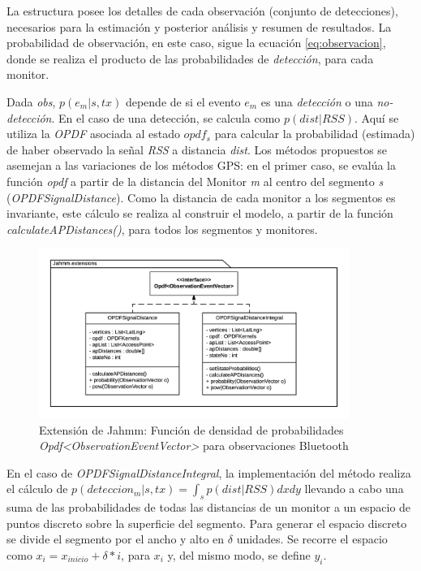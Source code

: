 La estructura posee los detalles de cada observación (conjunto de detecciones), necesarios para la estimación y posterior análisis y resumen de resultados. La probabilidad de observación, en este caso, sigue la ecuación \ref{eq:observacion}, donde se realiza el producto de las probabilidades de \textit{detección}, para cada monitor.

Dada \textit{obs}, $p(e_m|s,tx)$ depende de si el evento $e_m$ es una \textit{detección} o una \textit{no-detección}. En el caso de una detección, se calcula como $p(dist|RSS)$. Aquí se utiliza la \textit{OPDF} asociada al estado $opdf_s$ para calcular la probabilidad (estimada) de haber observado la señal \textit{RSS} a distancia \textit{dist}. Los métodos propuestos se asemejan a las variaciones de los métodos GPS: en el primer caso, se evalúa la función \textit{opdf} a partir de la distancia del Monitor \textit{m} al centro del segmento \textit{s} (\textit{OPDFSignalDistance}). Como la distancia de cada monitor a los segmentos es invariante, este cálculo se realiza al construir el modelo, a partir de la función \textit{calculateAPDistances()}, para todos los segmentos y monitores.

\begin{figure}[!htp]
	\centering
	\includegraphics[width=0.9\textwidth]{images/jahmm-bluetooth.png}
	\captionsetup{width=0.8\textwidth}
	\caption{Extensión de Jahmm: Función de densidad de probabilidades \textit{Opdf<ObservationEventVector>} para observaciones Bluetooth}
    \label{fig:jahmm-bluetooth}
\end{figure}

En el caso de \textit{OPDFSignalDistanceIntegral}, la implementación del método realiza el cálculo de $p(deteccion_m|s,tx) = \int_s p(dist|RSS) dxdy$ llevando a cabo una suma de las probabilidades de todas las distancias de un monitor a un espacio de puntos discreto sobre la superficie del segmento. Para generar el espacio discreto se divide el segmento por el ancho y alto en $\delta$ unidades. Se recorre el espacio como $x_i = x_{inicio} + \delta * i$, para $x_i$ y, del mismo modo, se define $y_i$.


